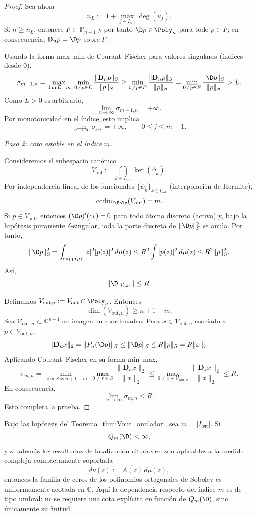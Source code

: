 \begin{proof}
	Sea ahora
	\[
		n_L:=1+\max_{j\in I_{\mathrm{out}}}\deg(u_j).
	\]
	Si $n\ge n_L$, entonces $F\subset\mathbb P_{n-1}$ y por tanto
	$\D p\in\Poly_n$ para todo $p\in F$; en consecuencia,
	$\mathbf D_n p=\D p$ sobre $F$.

	Usando la forma max--min de Courant--Fischer para valores singulares (índices desde $0$),
	\[
		\sigma_{m-1,n}
		=
		\max_{\dim E=m}\ \min_{0\ne p\in E}\frac{\|\mathbf D_np\|_S}{\|p\|_S}
		\ge
		\min_{0\ne p\in F}\frac{\|\mathbf D_np\|_S}{\|p\|_S}
		=
		\min_{0\ne p\in F}\frac{\|\D p\|_S}{\|p\|_S}
		> L.
	\]
	Como $L>0$ es arbitrario,
	\[
		\lim_{n\to\infty}\sigma_{m-1,n}=+\infty.
	\]
	Por monotonicidad en el índice, esto implica
	\[
		\lim_{n\to\infty}\sigma_{j,n}=+\infty,
		\qquad 0\le j\le m-1.
	\]

	\medskip
	\noindent
	\emph{Paso 2: cota estable en el índice $m$.}

	Consideremos el subespacio canónico
	\[
		V_{\mathrm{out}}:=\bigcap_{k\in I_{\mathrm{out}}}\ker(\psi_k).
	\]
	Por independencia lineal de los funcionales $\{\psi_k\}_{k\in I_{\mathrm{out}}}$
	(interpolación de Hermite),
	\[
		\operatorname{codim}_{\Poly}(V_{\mathrm{out}})=m.
	\]
	Si $p\in V_{\mathrm{out}}$, entonces $(\D p)'(c_k)=0$ para todo átomo discreto
	(activo) y, bajo la hipótesis puramente $\delta$-singular, toda la parte discreta de
	$\|\D p\|_S^2$ se anula. Por tanto,
	\[
		\|\D p\|_S^2
		=
		\int_{\operatorname{supp}(\mu)}|z|^2|p(z)|^2\,d\mu(z)
		\le
		R^2\int |p(z)|^2\,d\mu(z)
		\le
		R^2\|p\|_S^2.
	\]
	Así,
	\[
		\|\D|_{V_{\mathrm{out}}}\|\le R.
	\]

	Definamos $V_{\mathrm{out},n}:=V_{\mathrm{out}}\cap\Poly_n$. Entonces
	\[
		\dim(V_{\mathrm{out},n})\ge n+1-m.
	\]
	Sea $\mathcal V_{\mathrm{out},n}\subset\mathbb C^{n+1}$ su imagen en coordenadas.
	Para $x\in\mathcal V_{\mathrm{out},n}$ asociado a $p\in V_{\mathrm{out},n}$,
	\[
		\|\mathbf D_nx\|_2
		=
		\|P_n(\D p)\|_S
		\le
		\|\D p\|_S
		\le
		R\|p\|_S
		=
		R\|x\|_2.
	\]
	Aplicando Courant--Fischer en su forma min--max,
	\[
		\sigma_{m,n}
		=
		\min_{\dim S=n+1-m}\ \max_{0\ne x\in S}\frac{\|\mathbf D_nx\|_2}{\|x\|_2}
		\le
		\max_{0\ne x\in\mathcal V_{\mathrm{out},n}}\frac{\|\mathbf D_nx\|_2}{\|x\|_2}
		\le R.
	\]
	En consecuencia,
	\[
		\lim_{n\to\infty}\sigma_{m,n}\le R.
	\]
	Esto completa la prueba.
\end{proof}

\begin{thm}\label{thm:criterio_singular_ceros_objetivo}
	Bajo las hipótesis del Teorema~\ref{thm:Vout_anulador}, sea $m=|I_{\mathrm{out}}|$. Si
	\[
		Q_m(\D)<\infty,
	\]
	y si además los resultados de localización citados en
	\cite{lopez1999zero,lopez2001sobolev,marcellan2015sobolev} son aplicables a la
	medida compleja compactamente soportada
	\[
		d\nu(z):=\overline{A(z)}\,d\mu(z),
	\]
	entonces la familia de ceros de los polinomios ortogonales de Sobolev es uniformemente acotada en $\mathbb C$.
	Aquí la dependencia respecto del índice $m$ es de tipo umbral: no se requiere una cota explícita en función de $Q_m(\D)$, sino únicamente su finitud.
\end{thm}

